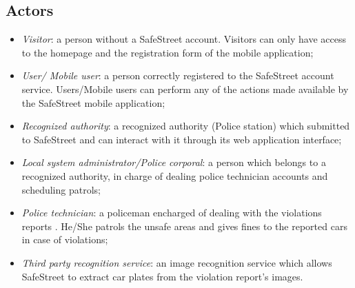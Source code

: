 \subsection{Actors}

\begin{itemize}
    \item \textit{Visitor}: a person without a SafeStreet account. Visitors can only have access to the homepage and the registration form of the mobile application;
    \item \textit{User/ Mobile user}: a person correctly registered to the SafeStreet account service. Users/Mobile users can perform any of the actions made available by the SafeStreet mobile application; 
    \item \textit{Recognized authority}: a recognized authority (Police station) which submitted to SafeStreet and can interact with it through its web application interface;
    \item \textit{Local system administrator/Police corporal}: a person which belongs to a recognized authority, in charge of dealing police technician accounts and scheduling patrols;
    \item \textit{Police technician}: a policeman encharged of dealing with the violations reports . He/She patrols the unsafe areas and gives fines to the reported cars in case of violations;
    \item \textit{Third party recognition service}: an image recognition service which allows SafeStreet to extract car plates from the violation report's images.
\end{itemize}


